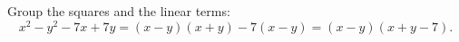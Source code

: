 Group the squares and the linear terms:
\[
x^2-y^2-7x+7y=(x-y)(x+y)-7(x-y)=\boxed{(x-y)(x+y-7)}.
\]
